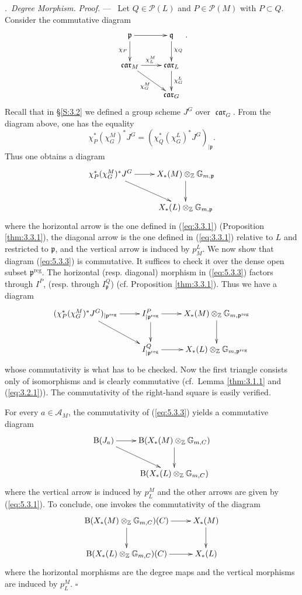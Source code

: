 \documentclass[12pt,a4paper,oneside,english,leqno]{smfart}
\makeatletter
\numberwithin{equation}{subsection}
\numberwithin{theo}{subsection}
\newenvironment{paragr}[1][]{\medskip\refstepcounter{subsection}%
  \par\noindent\hspace*{\parindent}\thesubsection.\ \emph{#1}%
  \@ifundefined{@empty}{}{}\ignorespaces}{\medskip}
\theoremstyle{plain}
\theoremstyle{definition}
\theoremstyle{remark}
\newenvironment{preuve}[1][]{\medskip\noindent\textit{Proof.} #1 ---\ }%
  {\hfill\ensuremath{\square}\medskip}
\DeclareMathOperator{\reg}{reg}
\DeclareMathOperator{\car}{\mathfrak{car}}
\newcommand{\ZZ}{\mathbb{Z}}
\newcommand{\pc}{\mathcal{P}}
\newcommand{\Ac}{\mathcal{A}}
\newcommand{\pgo}{\mathfrak{p}}
\newcommand{\qgo}{\mathfrak{q}}
\makeatother
\begin{document}
\begin{paragr}[Degree Morphism.]
\begin{preuve}
Let $Q\in \pc(L)$ and $P\in \pc(M)$ with $P\subset Q$. Consider the commutative diagram
$$\xymatrix{
\pgo \ar[r] \ar[d]_{\chi_P}  & \qgo \ar[d]^{\chi_Q }\\
\car_M \ar[rd]_{\chi^M_G} \ar[r]^{\chi^M_L} & \car_L \ar[d]^{\chi_G^L} \\
& \car_G
}.$$
Recall that in §\ref{S:3.2} we defined a group scheme $J^G$ over $\car_G$. From the diagram above, one has the equality
$$\chi_P^* (\chi_G^M)^* J^G=(\chi_Q^* (\chi_G^L)^* J^G)_{|\pgo}.$$
Thus one obtains a diagram
\begin{equation}\label{eq:5.3.3}
  \xymatrix{
    \chi_P^* (\chi_G^M)^* J^G  \ar[r]  \ar[rd] &  X_*(M)\otimes_{\ZZ} \mathbb{G}_{m,\pgo} \ar[d] \\
    & X_*(L)\otimes_{\ZZ} \mathbb{G}_{m,\pgo}
  }
\end{equation}
where the horizontal arrow is the one defined in (\ref{eq:3.3.1}) (Proposition \ref{thm:3.3.1}), the diagonal arrow is the one defined in (\ref{eq:3.3.1}) relative to $L$ and restricted to $\pgo$, and the vertical arrow is induced by $p_M^L$. We now show that diagram (\ref{eq:5.3.3}) is commutative. It suffices to check it over the dense open subset $\pgo^{\reg}$. The horizontal (resp. diagonal) morphism in (\ref{eq:5.3.3}) factors through $I^P$, (resp. through $I^Q_{\pgo}$) (cf. Proposition \ref{thm:3.3.1}). Thus we have a diagram
$$
\xymatrix{
(\chi_P^* (\chi_G^M)^* J^G)_{|\pgo^{\reg}}  \ar[r]  \ar[rd] & I^P_{|\pgo^{\reg}} \ar[r] \ar[d] &  X_*(M)\otimes_{\ZZ} \mathbb{G}_{m,\pgo^{\reg}} \ar[d] \\
&   I^Q_{|\pgo^{\reg}} \ar[r]   &  X_*(L)\otimes_{\ZZ} \mathbb{G}_{m,\pgo^{\reg}} }
$$
whose commutativity is what has to be checked. Now the first triangle consists only of isomorphisms and is clearly commutative (cf.\ Lemma \ref{thm:3.1.1} and (\ref{eq:3.2.1})). The commutativity of the right-hand square is easily verified.

For every $a\in \Ac_M$, the commutativity of (\ref{eq:5.3.3}) yields a commutative diagram
$$
\xymatrix{
\mathrm{B}(J_a) \ar[r] \ar[rd] &  \mathrm{B}(X_*(M)\otimes_{\ZZ} \mathbb{G}_{m,C}) \ar[d]\\
&  \mathrm{B}(X_*(L)\otimes_{\ZZ} \mathbb{G}_{m,C}) }
$$
where the vertical arrow is induced by $p^M_L$ and the other arrows are given by (\ref{eq:5.3.1}). To conclude, one invokes the commutativity of the diagram
$$
\xymatrix{
\mathrm{B}(X_*(M)\otimes_{\ZZ} \mathbb{G}_{m,C})(C) \ar[r] \ar[d] & X_*(M) \ar[d] \\
\mathrm{B}(X_*(L)\otimes_{\ZZ} \mathbb{G}_{m,C})(C)  \ar[r] & X_*(L) }
$$
where the horizontal morphisms are the degree maps and the vertical morphisms are induced by $p_L^M$.
\end{preuve}
\end{paragr}
\end{document}
